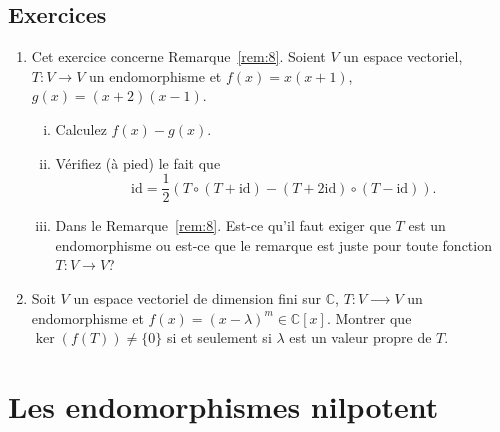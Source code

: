 \subsection*{Exercices}
\label{sec:exercices}
\begin{enumerate}
\item Cet exercice concerne Remarque~\ref{rem:8}.  Soient $V$ un espace vectoriel, $T: V → V$ un endomorphisme et   $f(x) = x (x+1)$, $g(x) = (x+2)(x-1)$.
  \begin{enumerate}[i)]
  \item Calculez $f(x) - g(x)$.
  \item Vérifiez (à pied) le  fait que
    \begin{displaymath}\displaystyle
      \mathrm{id} = \frac{1}{2} \left(  T \circ (T+ \mathrm{id}) -  (T+2 \mathrm{id})\circ (T- \mathrm{id})  \right). 
    \end{displaymath}
  \item Dans le Remarque~\ref{rem:8}.  Est-ce qu'il faut exiger que $T$ est un endomorphisme ou est-ce que le remarque est juste pour toute fonction $T: V → V$?
  \end{enumerate}
\item Soit $V$ un espace vectoriel de dimension fini sur $ℂ$,  $T : V ⟶V$ un endomorphisme et $f(x) = (x - λ)^m ∈ ℂ[x]$. Montrer que $\ker(f(T)) \neq \{0\}$ si et seulement si $λ$ est un valeur propre de $T$.

\end{enumerate}

\section{Les endomorphismes nilpotent}
\label{sec:les-endom-nilp}







